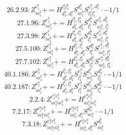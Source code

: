 \documentclass[letterpaper,10pt,fleqn,leqno,onecolumn]{article}
\begin{document}
\begin{equation} \;\;\;\;\;\;  26.2.93: Z^{e_{1}^{b}}_{m_{1}^{b}}+=H^{l_{1}^{a}l_{1}^{b}}_{d_{1}^{b},d_{1}^{a}}S^{d_{1}^{b}}_{m_{1}^{b}}S^{e_{1}^{b},d_{1}^{a}}_{l_{1}^{a}l_{1}^{b}}\cdot -1/1 \end{equation}
\begin{equation} \;\;\;\;\;\;  27.1.96: Z^{e_{1}^{b}}_{m_{1}^{b}}+=H^{l_{1}^{b},l_{2}^{b}}_{d_{1}^{b},d_{2}^{b}}S^{d_{1}^{b}}_{l_{1}^{b}}S^{e_{1}^{b},d_{2}^{b}}_{m_{1}^{b},l_{2}^{b}} \end{equation}
\begin{equation} \;\;\;\;\;\;  27.3.98: Z^{e_{1}^{b}}_{m_{1}^{b}}+=H^{l_{1}^{b},l_{1}^{a}}_{d_{1}^{b},d_{1}^{a}}S^{d_{1}^{b}}_{l_{1}^{b}}S^{e_{1}^{b},d_{1}^{a}}_{m_{1}^{b},l_{1}^{a}} \end{equation}
\begin{equation} \;\;\;\;\;\;  27.5.100: Z^{e_{1}^{b}}_{m_{1}^{b}}+=H^{l_{1}^{a},l_{1}^{b}}_{d_{1}^{a},d_{1}^{b}}S^{d_{1}^{a}}_{l_{1}^{a}}S^{e_{1}^{b},d_{1}^{b}}_{m_{1}^{b},l_{1}^{b}} \end{equation}
\begin{equation} \;\;\;\;\;\;  27.7.102: Z^{e_{1}^{b}}_{m_{1}^{b}}+=H^{l_{1}^{a},l_{2}^{a}}_{d_{1}^{a},d_{2}^{a}}S^{d_{1}^{a}}_{l_{1}^{a}}S^{e_{1}^{b},d_{2}^{a}}_{m_{1}^{b},l_{2}^{a}} \end{equation}
\begin{equation} \;\;\;\;\;\;  40.1.186: Z^{e_{1}^{b}}_{m_{1}^{b}}+=H^{l_{1}^{b},l_{2}^{b}}_{d_{1}^{b},d_{2}^{b}}S^{e_{1}^{b}}_{l_{1}^{b}}S^{d_{1}^{b}}_{m_{1}^{b}}S^{d_{2}^{b}}_{l_{2}^{b}}\cdot -1/1 \end{equation}
\begin{equation} \;\;\;\;\;\;  40.2.187: Z^{e_{1}^{b}}_{m_{1}^{b}}+=H^{l_{1}^{b},l_{1}^{a}}_{d_{1}^{b},d_{1}^{a}}S^{e_{1}^{b}}_{l_{1}^{b}}S^{d_{1}^{b}}_{m_{1}^{b}}S^{d_{1}^{a}}_{l_{1}^{a}}\cdot -1/1 \end{equation}
\begin{equation} \;\;\;\;\;\;  2.2.4: Z^{e_{1}^{a}e_{1}^{b}}_{m_{1}^{a}m_{1}^{b}}+=H^{e_{1}^{a}e_{1}^{b}}_{m_{1}^{a}m_{1}^{b}} \end{equation}
\begin{equation} \;\;\;\;\;\;  7.2.17: Z^{e_{1}^{a}e_{1}^{b}}_{m_{1}^{a}m_{1}^{b}}+=H^{e_{1}^{a}e_{1}^{b}}_{m_{1}^{b},d_{1}^{a}}S^{d_{1}^{a}}_{m_{1}^{a}}\cdot -1/1 \end{equation}
\begin{equation} \;\;\;\;\;\;  7.3.18: Z^{e_{1}^{a}e_{1}^{b}}_{m_{1}^{a}m_{1}^{b}}+=H^{e_{1}^{a}e_{1}^{b}}_{m_{1}^{a},d_{1}^{b}}S^{d_{1}^{b}}_{m_{1}^{b}} \end{equation}
\end{document}
